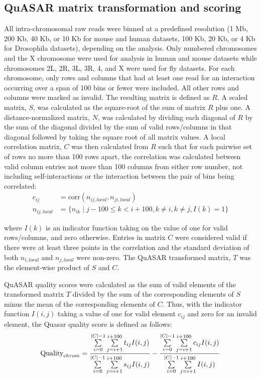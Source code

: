\subsection{QuASAR matrix transformation and scoring}

All intra-chromosomal raw reads were binned at a predefined resolution (1 Mb, 200 Kb, 40 Kb, or 10 Kb for mouse and human datasets, 100 Kb, 20 Kb, or 4 Kb for Drosophila datasets), depending on the analysis. Only numbered chromosomes and the X chromosome were used for analysis in human and mouse datasets while chromosomes 2L, 2R, 3L, 3R, 4, and X were used for fly datasets. For each chromosome, only rows and columns that had at least one read for an interaction occurring over a span of 100 bins or fewer were included. All other rows and columns were marked as invalid. The resulting matrix is defined as $R$. A scaled matrix, $S$, was calculated as the square-root of the sum of matrix $R$ plus one. A distance-normalized matrix, $N$, was calculated by dividing each diagonal of $R$ by the sum of the diagonal divided by the sum of valid rows/columns in that diagonal followed by taking the square root of all matrix values. A local correlation matrix, $C$ was then calculated from $R$ such that for each pairwise set of rows no more than 100 rows apart, the correlation was calculated between valid column entries not more than 100 columns from either row number, not including self-interactions or the interaction between the pair of bins being correlated:
\begin{align*}
  c_{ij} &= \text{corr}(n_{ij,local},n_{ji,local}) \\
  n_{ij,local} &= \{ n_{ik} \mid j-100 \leq k < i+100, k \neq i, k \neq j, I(k) = 1 \}
\end{align*}

where $I(k)$ is an indicator function taking on the value of one for valid rows/columns, and zero otherwise. Entries in matrix $C$ were considered valid if there were at least three points in the correlation and the standard deviation of both $n_{i,local}$ and $n_{j,local}$ were non-zero. The QuASAR transformed matrix, $T$ was the element-wise product of $S$ and $C$.

QuASAR quality scores were calculated as the sum of valid elements of the transformed matrix $T$ divided by the sum of the corresponding elements of $S$ minus the mean of the corresponding elements of $C$. Thus, with the indicator function $I(i,j)$ taking a value of one for valid element $c_{ij}$ and zero for an invalid element, the Quasar quality score is defined as follows:
\[\textnormal{Quality}_{chrom}=\frac{\sum\limits_{i=0}^{|C|-1}\sum\limits_{j=i+1}^{i+100}t_{ij}I(i,j)}{\sum\limits_{i=0}^{|C|-1}\sum\limits_{j=i+1}^{i+100}s_{ij}I(i,j)}-\frac{\sum\limits_{i=0}^{|C|-1}\sum\limits_{j=i+1}^{i+100}c_{ij}I(i,j)}{\sum\limits_{i=0}^{|C|-1}\sum\limits_{j=i+1}^{i+100}I(i,j)}\]

